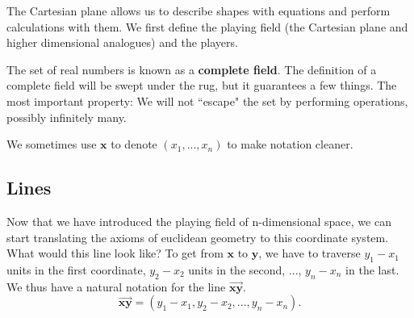 The Cartesian plane allows us to describe shapes with equations and perform calculations with them. We first define the playing field (the Cartesian plane and higher dimensional analogues) and the players.
\begin{remark}
	The set of real numbers is known as a \textbf{complete field}. The definition of a complete field will be swept under the rug, but it guarantees a few things. The most important property: We will not ``escape" the set by performing operations, possibly infinitely many.
\end{remark}
\begin{remark}
	We sometimes use $\mathbf{x}$ to denote $(x_1,...,x_n)$ to make notation cleaner.
\end{remark}
\subsection{Lines}
Now that we have introduced the playing field of n-dimensional space, we can start translating the axioms of euclidean geometry to this coordinate system.
What would this line look like? To get from $\mathbf{x}$ to $\mathbf{y}$, we have to traverse $y_1-x_1$ units in the first coordinate, $y_2-x_2$ units in the second, ..., $y_n-x_n$ in the last. We thus have a natural notation for the line $\overrightarrow{\mathbf{xy}}$.
\[
 \overrightarrow{\mathbf{xy}}=(y_1-x_1,y_2-x_2,...,y_n-x_n).
\]

